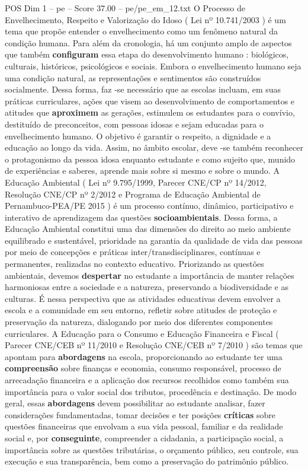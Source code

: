 \begin{textsample}{POS Dim 1 – pe – Score 37.00 – pe/pe\_em\_12.txt}
O Processo de Envelhecimento, Respeito e Valorização do Idoso ( Lei nº 10.741/2003 ) é um tema que propõe entender o envelhecimento como um fenômeno natural da condição humana.
Para além da cronologia, há um conjunto amplo de aspectos que também \textbf{configuram} essa etapa do desenvolvimento humano : biológicos, culturais, históricos, psicológicos e sociais.
Embora o envelhecimento humano seja uma condição natural, as representações e sentimentos são construídos socialmente.
Dessa forma, faz -se necessário que as escolas incluam, em suas práticas curriculares, ações que visem ao desenvolvimento de comportamentos e atitudes que \textbf{aproximem} as gerações, estimulem os estudantes para o convívio, destituído de preconceitos, com pessoas idosas e sejam educadas para o envelhecimento humano.
O objetivo é garantir o respeito, a dignidade e a educação ao longo da vida.
Assim, no âmbito escolar, deve -se também reconhecer o protagonismo da pessoa idosa enquanto estudante e como sujeito que, munido de experiências e saberes, aprende mais sobre si mesmo e sobre o mundo.
A Educação Ambiental ( Lei nº 9.795/1999, Parecer CNE/CP nº 14/2012, Resolução CNE/CP nº 2/2012 e Programa de Educação Ambiental de Pernambuco-PEA/PE 2015 ) é um processo contínuo, dinâmico, participativo e interativo de aprendizagem das questões \textbf{socioambientais}.
Dessa forma, a Educação Ambiental constitui uma das dimensões do direito ao meio ambiente equilibrado e sustentável, prioridade na garantia da qualidade de vida das pessoas por meio de concepções e práticas inter/transdisciplinares, contínuas e permanentes, realizadas no contexto educativo.
Priorizando as questões ambientais, devemos \textbf{despertar} no estudante a importância de manter relações harmoniosas entre a sociedade e a natureza, preservando a biodiversidade e as culturas.
É nessa perspectiva que as atividades educativas devem envolver a escola e a comunidade em seu entorno, refletir sobre atitudes de proteção e preservação da natureza, dialogando por meio dos diferentes componentes curriculares.
A Educação para o Consumo e Educação Financeira e Fiscal ( Parecer CNE/CEB nº 11/2010 e Resolução CNE/CEB nº 7/2010 ) são temas que apontam para \textbf{abordagens} na escola, proporcionando ao estudante ter uma \textbf{compreensão} sobre finanças e economia, consumo responsável, processo de arrecadação financeira e a aplicação dos recursos recolhidos como também sua importância para o valor social dos tributos, procedência e destinação.
De modo geral, essas \textbf{abordagens} devem possibilitar ao estudante analisar, fazer considerações fundamentadas, tomar decisões e ter posições \textbf{críticas} sobre questões financeiras que envolvam a sua vida pessoal, familiar e da realidade social e, por \textbf{conseguinte}, compreender a cidadania, a participação social, a importância sobre as questões tributárias, o orçamento público, seu controle, sua execução e sua transparência, bem como a preservação do patrimônio público.

\end{textsample}
